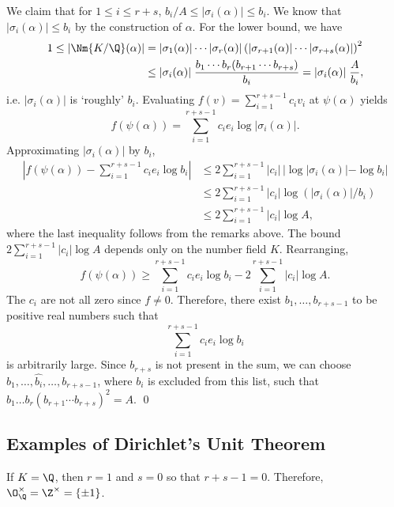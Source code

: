 We claim that for $1 \leq i \leq r+s$, $b_i/A \leq |\sigma_i(\alpha)| \leq b_i$. We know that $|\sigma_i(\alpha)| \leq b_i$ by the construction of $\alpha$. For the lower bound, we have
	\[
	\begin{split}
	1 \leq |\Nm{K/\Q}(\alpha)| &= |\sigma_1(\alpha)| \cdots |\sigma_r(\alpha)| \left( |\sigma_{r+1}(\alpha)| \cdots |\sigma_{r+s}(\alpha)| \right)^2 \\
	&\leq |\sigma_i(\alpha)| \; \dfrac{b_1 \cdots b_r(b_{r+1} \cdots b_{r+s})}{b_i} = |\sigma_i(\alpha)| \; \dfrac{A}{b_i},
	\end{split}
	\]
i.e. $|\sigma_i(\alpha)|$ is `roughly' $b_i$. Evaluating $f(v)= \sum_{i=1}^{r+s-1} c_iv_i$ at $\psi(\alpha)$ yields
	\[
	f(\psi(\alpha))= \sum_{i=1}^{r+s-1} c_i e_i \log |\sigma_i(\alpha)|.
	\]
Approximating $|\sigma_i(\alpha)|$ by $b_i$,
	\[
	\begin{split}
	\left| f(\psi(\alpha)) - \sum_{i=1}^{r+s-1} c_ie_i \log b_i \right| &\leq 2 \sum_{i=1}^{r+s-1} |c_i| \, |\log|\sigma_i(\alpha)| - \log b_i | \\
	&\leq 2 \sum_{i=1}^{r+s-1} |c_i| \log(|\sigma_i(\alpha)|/b_i) \\
	&\leq 2\sum_{i=1}^{r+s-1} |c_i| \log A,
	\end{split}
	\]
where the last inequality follows from the remarks above. The bound $2\sum_{i=1}^{r+s-1} |c_i| \log A$ depends only on the number field $K$. Rearranging,
	\[
	f(\psi(\alpha)) \geq \sum_{i=1}^{r+s-1} c_i e_i \log b_i - 2 \sum_{i=1}^{r+s-1} |c_i| \log A.
	\]
The $c_i$ are not all zero since $f \neq 0$. Therefore, there exist $b_1,\ldots,b_{r+s-1}$ to be positive real numbers such that
	\[
	\sum_{i=1}^{r+s-1} c_ie_i \log b_i
	\]
is arbitrarily large. Since $b_{r+s}$ is not present in the sum, we can choose $b_1,\ldots,\hat{b_i},\ldots,b_{r+s-1}$, where $b_i$ is excluded from this list, such that $b_1\ldots b_r(b_{r+1} \cdots b_{r+s})^2=A$. \qed \\





\subsection{Examples of Dirichlet's Unit Theorem}





\begin{ex}
If $K=\Q$, then $r=1$ and $s=0$ so that $r+s-1=0$. Therefore, $\O_\Q^\times=\Z^\times=\{\pm1\}$. \xqed
\end{ex}

